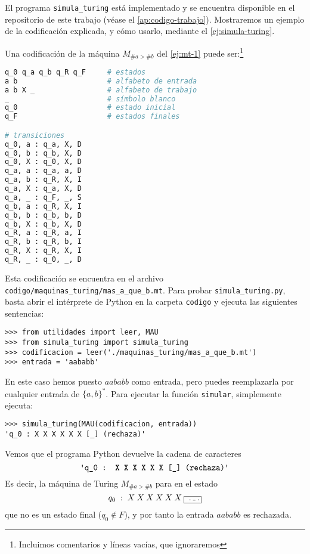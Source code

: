El programa \texttt{simula\_turing} está implementado y se encuentra disponible en el repositorio de este trabajo (véase el \cref{ap:codigo-trabajo}). Mostraremos un ejemplo de la codificación explicada, y cómo usarlo, mediante el \cref{ej:simula-turing}.

\begin{ejemplo}\label{ej:simula-turing}
Una codificación de la máquina $M_{\#a>\#b}$ del \cref{ej:mt-1} puede ser:\footnote{Incluimos comentarios y líneas vacías, que ignoraremos}

\begin{lstlisting}[language=Python]
q_0 q_a q_b q_R q_F     # estados
a b                     # alfabeto de entrada
a b X _                 # alfabeto de trabajo
_                       # símbolo blanco
q_0                     # estado inicial
q_F                     # estados finales

# transiciones
q_0, a : q_a, X, D
q_0, b : q_b, X, D
q_0, X : q_0, X, D
q_a, a : q_a, a, D
q_a, b : q_R, X, I
q_a, X : q_a, X, D
q_a, _ : q_F, _, S
q_b, a : q_R, X, I
q_b, b : q_b, b, D
q_b, X : q_b, X, D
q_R, a : q_R, a, I
q_R, b : q_R, b, I
q_R, X : q_R, X, I
q_R, _ : q_0, _, D
\end{lstlisting}

Esta codificación se encuentra en el archivo \texttt{codigo/maquinas\_turing/mas\_a\_que\_b.mt}. Para probar \texttt{simula\_turing.py}, basta abrir el intérprete de Python en la carpeta \texttt{codigo} y ejecuta las siguientes sentencias:

\begin{lstlisting}[numbers=none,frame=none]
>>> from utilidades import leer, MAU
>>> from simula_turing import simula_turing
>>> codificacion = leer('./maquinas_turing/mas_a_que_b.mt')
>>> entrada = 'aababb'
\end{lstlisting}
En este caso hemos puesto $aababb$ como entrada, pero puedes reemplazarla por cualquier entrada de $\{a,b\}^*$. Para ejecutar la función \texttt{simular}, simplemente ejecuta:

\begin{lstlisting}[numbers=none,frame=none]
>>> simula_turing(MAU(codificacion, entrada))
'q_0 : X X X X X X [_] (rechaza)'
\end{lstlisting}
Vemos que el programa Python devuelve la cadena de caracteres $$\texttt{\textquotesingle{}q\_0 : X X X X X X [\_] (rechaza)\textquotesingle}$$Es decir, la máquina de Turing $M_{\#a>\#b}$ para en el estado
$$
    q_0\;:\;X\:X\:X\:X\:X\:X\:\fbox{\Vtextvisiblespace}
$$
que no es un estado final ($q_0 \notin F$), y por tanto la entrada $aababb$ es rechazada.
\end{ejemplo}

